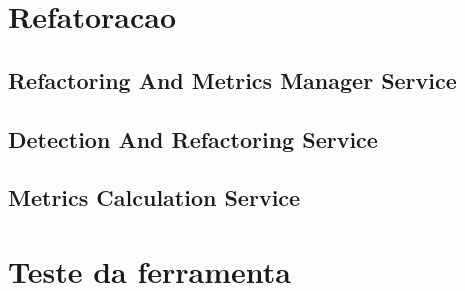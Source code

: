 \section{Refatoracao}

\subsection{Refactoring And Metrics Manager Service}

\subsection{Detection And Refactoring Service}

\subsection{Metrics Calculation Service}

\section{Teste da ferramenta}